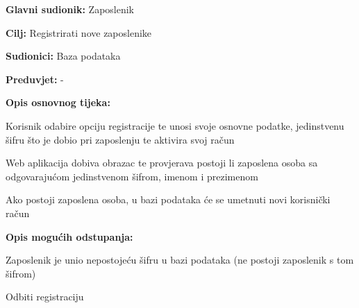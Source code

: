 				\noindent {}
				\begin{packed_item}
					
					\item \textbf{Glavni sudionik:} Zaposlenik
					\item  \textbf{Cilj:} Registrirati nove zaposlenike
					\item  \textbf{Sudionici:} Baza podataka
					\item  \textbf{Preduvjet:} -
					\item  \textbf{Opis osnovnog tijeka:}
					
					\item[] \begin{packed_enum}
						
						\item Korisnik odabire opciju registracije te unosi svoje osnovne podatke, jedinstvenu šifru što je dobio pri zaposlenju te aktivira svoj račun
						\item Web aplikacija dobiva obrazac te provjerava postoji li zaposlena osoba sa odgovarajućom jedinstvenom šifrom, imenom i prezimenom
						\item Ako postoji zaposlena osoba, u bazi podataka će se umetnuti novi korisnički račun 
						
					\end{packed_enum}
				
					\item  \textbf{Opis mogućih odstupanja:}
					
					\item[] \begin{packed_item}
						
						\item[1.] Zaposlenik je unio nepostojeću šifru u bazi podataka (ne postoji zaposlenik s tom šifrom)
						
						\item[] \begin{packed_enum}
							
							\item Odbiti registraciju
							
						\end{packed_enum}
						
					\end{packed_item}
					
				\end{packed_item}
				
